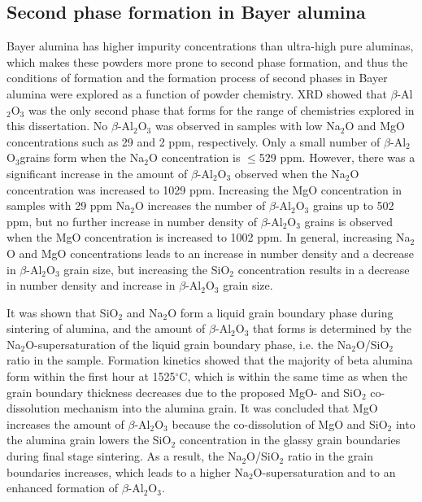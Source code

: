 \subsection{Second phase formation in Bayer alumina}
Bayer alumina has higher impurity concentrations than ultra-high pure aluminas, which makes these powders more prone to second phase formation, and thus the conditions of formation and the formation process of second phases in Bayer alumina were explored as a function of powder chemistry. XRD showed that $\beta$-Al$_{2}$O$_{3}$ was the only second phase that forms for the range of chemistries explored in this dissertation. No $\beta$-Al$_{2}$O$_{3}$ was observed in samples with low Na$_{2}$O and MgO concentrations such as 29 and 2 ppm, respectively. Only a small number of $\beta$-Al$_{2}$O$_{3}$grains form when the Na$_{2}$O concentration is $\leq$529 ppm. However, there was a significant increase in the amount of $\beta$-Al$_{2}$O$_{3}$ observed when the Na$_{2}$O concentration was increased to 1029 ppm. Increasing the MgO concentration in samples with 29 ppm Na$_{2}$O increases the number of $\beta$-Al$_{2}$O$_{3}$ grains up to 502 ppm, but no further increase in number density of $\beta$-Al$_{2}$O$_{3}$ grains is observed when the MgO concentration is increased to 1002 ppm. In general, increasing Na$_{2}$O and MgO concentrations leads to an increase in number density and a decrease in $\beta$-Al$_{2}$O$_{3}$ grain size, but increasing the SiO$_{2}$ concentration results in a decrease in number density and increase in $\beta$-Al$_{2}$O$_{3}$ grain size. 

It was shown that SiO$_{2}$ and Na$_{2}$O form a liquid grain boundary phase during sintering of alumina, and the amount of $\beta$-Al$_{2}$O$_{3}$ that forms is determined by the Na$_{2}$O-supersaturation of the liquid grain boundary phase, i.e. the Na$_{2}$O/SiO$_{2}$ ratio in the sample. Formation kinetics showed that the majority of beta alumina form within the first hour at 1525$^{\circ}$C, which is within the same time as when the grain boundary thickness decreases due to the proposed MgO- and SiO$_{2}$ co-dissolution mechanism into the alumina grain. It was concluded that MgO increases the amount of $\beta$-Al$_{2}$O$_{3}$ because the co-dissolution of MgO and SiO$_{2}$ into the alumina grain lowers the SiO$_{2}$ concentration in the glassy grain boundaries during final stage sintering. As a result, the Na$_{2}$O/SiO$_{2}$ ratio in the grain boundaries increases, which leads to a higher Na$_{2}$O-supersaturation and to an enhanced formation of $\beta$-Al$_{2}$O$_{3}$. 

